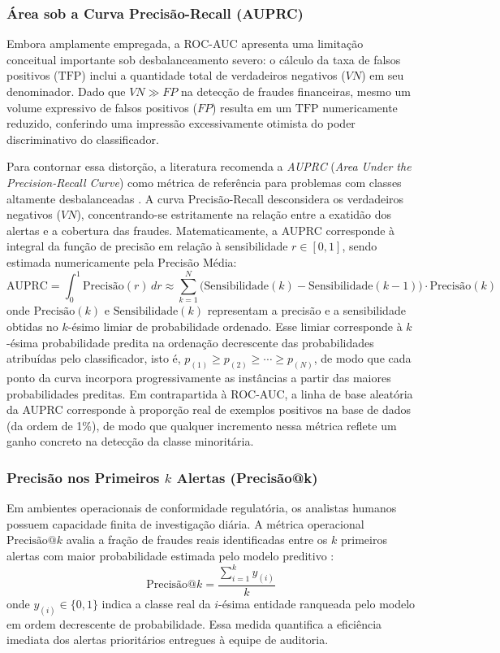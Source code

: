 \documentclass[titlepage,a4paper,oneside,onecolumn,12pt]{report}
\begin{document}
\subsubsection{Área sob a Curva Precisão-Recall (AUPRC)}
Embora amplamente empregada, a ROC-AUC apresenta uma limitação conceitual importante sob desbalanceamento severo: o cálculo da taxa de falsos positivos ($\mathrm{TFP}$) inclui a quantidade total de verdadeiros negativos ($VN$) em seu denominador. Dado que $VN \gg FP$ na detecção de fraudes financeiras, mesmo um volume expressivo de falsos positivos ($FP$) resulta em um $\mathrm{TFP}$ numericamente reduzido, conferindo uma impressão excessivamente otimista do poder discriminativo do classificador.

Para contornar essa distorção, a literatura recomenda a \textit{AUPRC} (\textit{Area Under the Precision-Recall Curve}) como métrica de referência para problemas com classes altamente desbalanceadas \cite{liu2022bond}. A curva Precisão-Recall desconsidera os verdadeiros negativos ($VN$), concentrando-se estritamente na relação entre a exatidão dos alertas e a cobertura das fraudes. Matematicamente, a AUPRC corresponde à integral da função de precisão em relação à sensibilidade $r \in [0, 1]$, sendo estimada numericamente pela Precisão Média:
\begin{equation}
    \mathrm{AUPRC} = \int_{0}^{1} \text{Precisão}(r) \, dr \approx \sum_{k=1}^{N} \big( \mathrm{Sensibilidade}(k) - \mathrm{Sensibilidade}(k-1) \big) \cdot \text{Precisão}(k)
\end{equation}
onde $\text{Precisão}(k)$ e $\mathrm{Sensibilidade}(k)$ representam a precisão e a sensibilidade obtidas no $k$-ésimo limiar de probabilidade ordenado. Esse limiar corresponde à $k$-ésima probabilidade predita na ordenação decrescente das probabilidades atribuídas pelo classificador, isto é, $p_{(1)} \geq p_{(2)} \geq \cdots \geq p_{(N)}$, de modo que cada ponto da curva incorpora progressivamente as instâncias a partir das maiores probabilidades preditas. Em contrapartida à ROC-AUC, a linha de base aleatória da AUPRC corresponde à proporção real de exemplos positivos na base de dados (da ordem de 1\%), de modo que qualquer incremento nessa métrica reflete um ganho concreto na detecção da classe minoritária.

\subsubsection{Precisão nos Primeiros \texorpdfstring{$k$}{k} Alertas (Precisão@k)}
Em ambientes operacionais de conformidade regulatória, os analistas humanos possuem capacidade finita de investigação diária. A métrica operacional $\text{Precisão@}k$ avalia a fração de fraudes reais identificadas entre os $k$ primeiros alertas com maior probabilidade estimada pelo modelo preditivo \cite{karim2024scalable}:
\begin{equation}
    \text{Precisão@}k = \frac{\sum_{i=1}^{k} y_{(i)}}{k}
\end{equation}
onde $y_{(i)} \in \{0, 1\}$ indica a classe real da $i$-ésima entidade ranqueada pelo modelo em ordem decrescente de probabilidade. Essa medida quantifica a eficiência imediata dos alertas prioritários entregues à equipe de auditoria.
\end{document}
